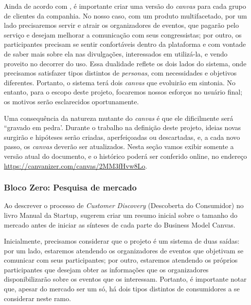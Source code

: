 \documentclass[12pt,a4paper,twoside,hyphens,english,brazil]{abntex2}
\begin{document}
Ainda de acordo com \citeauthor{lean-canvas}, é importante criar uma versão do \emph{canvas} para cada grupo de clientes da companhia. No nosso caso, com um produto multifacetado, por um lado precisaremos servir e atrair os organizadores de eventos, que pagarão pelo serviço e desejam melhorar a comunicação com seus congressistas; por outro, os participantes precisam se sentir confortáveis dentro da plataforma e com vontade de saber mais sobre ela nas divulgações, interessados em utilizá-la, e vendo proveito no decorrer do uso. Essa dualidade reflete os dois lados do sistema, onde precisamos satisfazer tipos distintos de \emph{personas}, com necessidades e objetivos diferentes. Portanto, o sistema terá dois \emph{canvas} que evoluirão em sintonia. No entanto, para o escopo deste projeto, focaremos nossos esforços no usuário final; os motivos serão esclarecidos oportunamente. %

Uma consequência da natureza mutante do \emph{canvas} é que ele dificilmente será ``gravado em pedra'. Durante o trabalho na definição deste projeto, ideias novas surgirão e hipóteses serão criadas, aperfeiçoadas ou descartadas, e, a cada novo passo, os \emph{canvas} deverão ser atualizados. Nesta seção vamos exibir somente a versão atual do documento, e o histórico poderá ser conferido online, no endereço \mbox{\url{https://canvanizer.com/canvas/2MM3fHvw8Lo}}.

\subsubsection*{Bloco Zero: Pesquisa de mercado}
\label{sec:lean:mercado}
Ao descrever o processo de \textit{Customer Discovery} (Descoberta do Consumidor) no livro Manual da Startup\cite{manual-startup},  sugerem criar um resumo inicial sobre o tamanho do mercado antes de iniciar as sínteses de cada parte do Business Model Canvas.

Inicialmente, precisamos considerar que o projeto é um sistema de duas saídas: por um lado, estaremos atendendo os organizadores de eventos que objetivam se comunicar com seus participantes; por outro, estaremos atendendo os próprios participantes que desejam obter as informações que os organizadores disponibilizarão sobre os eventos que os interessam. Portanto, é importante notar que, apesar do mercado ser um só, há dois tipos distintos de consumidores a se considerar neste ramo.
\end{document}
